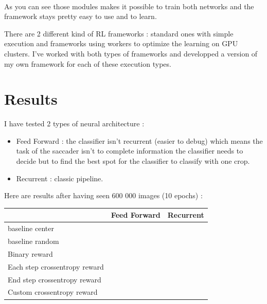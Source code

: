 \documentclass[11pt]{article}
\begin{document}
\paragraph{}
As you can see those modules makes it possible to train both networks and the framework stays pretty easy to use and to learn.

There are 2 different kind of RL frameworks : standard ones with simple execution and frameworks using workers to optimize the learning on GPU clusters. I've worked with both types of frameworks and developped a version of my own framework for each of these execution types.

\section{Results}
I have tested 2 types of neural architecture :
\begin{itemize}
\item Feed Forward : the classifier isn't recurrent (easier to debug) which means the task of the saccader isn't to complete information the classifier needs to decide but to find the best spot for the classifier to classify with one crop.
\item Recurrent : classic pipeline.
\end{itemize}
Here are results after having seen 600 000 images (10 epochs) :
\begin{center} %
   \begin{tabular}{| l | c || r | }
     \hline
      & Feed Forward & Recurrent \\ \hline
      baseline center &  & \\ \hline
      baseline random & & \\ \hline
      Binary reward & & \\ \hline
     Each step crossentropy reward & & \\ \hline
     End step crossentropy reward & & \\ \hline
     Custom crossentropy reward & & \\
     \hline
   \end{tabular}
 \end{center}
\end{document}

